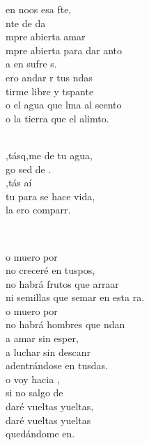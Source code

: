 \documentclass[12pt]{article}
\begin{document}
\begin{multicols*}{2}
\begin{cancion}
	 en noos esa fte,\\
	nte de da\\
	mpre abierta  amar\\
	mpre abierta para dar anto\\
	a en sufre s. \\
	ero andar r tus ndas\\
	tirme libre y tspante\\
	o el agua que lma al seento\\
	o la tierra que el alimto.\\\jump\\
	\begin{chorus}%
	,tásq,me de tu agua, \\
	go sed de .\\
	,tás aí\\
	tu para se hace vida,\\
	la ero comparr.\\
	\end{chorus}%
	\jump\\
\end{cancion}%

\begin{cancion}%
	o muero por  \\
	no creceré en tuspos,\\
	no habrá frutos que arraar\\
	ni semillas que semar en esta ra.\\
\jump
	o muero por  \\
	no habrá hombres que ndan\\
	a amar sin esper,\\
	a luchar sin descanr\\
	adentrándose en tusdas.\\
\jump
	o voy hacia ,\\
	si no salgo de \\
	daré vueltas yueltas,\\
	daré vueltas yueltas\\
	quedándome en.\\
\end{cancion}%


\end{multicols*}
\end{document}
